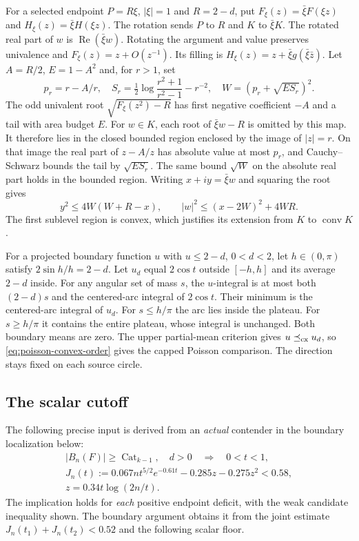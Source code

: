 \documentclass[11pt]{article}
\newcommand{\Cat}{\operatorname{Cat}}
\begin{document}
	For a selected endpoint $P=R\xi$, $|\xi|=1$ and $R=2-d$, put
	$F_\xi(z)=\bar\xi F(\xi z)$ and $H_\xi(z)=\bar\xi H(\xi z)$.
	The rotation sends $P$ to $R$ and $K$ to $\bar\xi K$.
	The rotated real part of $w$ is $\operatorname{Re}(\bar\xi w)$.
	Rotating the argument and value preserves univalence and
	$F_\xi(z)=z+O(z^{-1})$. Its filling is
	$H_\xi(z)=z+\bar\xi g(\bar\xi\bar z)$.
	Let $A=R/2$, $E=1-A^2$ and, for $r>1$, set
	\[
	p_r=r-A/r,\quad
	S_r=\tfrac12\log\frac{r^2+1}{r^2-1}-r^{-2},\quad
	W=(p_r+\sqrt{E S_r})^2.
	\]
	The odd univalent root $\sqrt{F_\xi(z^2)-R}$ has first negative
	coefficient $-A$ and a tail with area budget $E$. For $w\in K$,
	each root of $\bar\xi w-R$ is omitted by this map. It therefore lies
	in the closed bounded region enclosed by the image of $|z|=r$.
	On that image the real part of $z-A/z$ has absolute value at most
	$p_r$, and Cauchy--Schwarz bounds the tail by $\sqrt{ES_r}$.
	The same bound $\sqrt W$ on the absolute real part holds in the
	bounded region. Writing $x+iy=\bar\xi w$ and squaring the root gives
	\begin{equation}\label{eq:whole-strip}
		y^2\leq4W(W+R-x),
		\qquad |w|^2\leq(x-2W)^2+4WR.
	\end{equation}
	The first sublevel region is convex, which justifies its extension
	from $K$ to $\operatorname{conv}K$.
	
	For a projected boundary function $u$ with $u\leq2-d$, $0<d<2$,
	let $h\in(0,\pi)$ satisfy $2\sin h/h=2-d$. Let $u_d$ equal
	$2\cos t$ outside $[-h,h]$ and its average $2-d$ inside.
	For any angular set of mass $s$, the $u$-integral is at most both
	$(2-d)s$ and the centered-arc integral of $2\cos t$. Their minimum
	is the centered-arc integral of $u_d$. For $s\leq h/\pi$ the arc lies
	inside the plateau. For $s\geq h/\pi$ it contains the entire plateau,
	whose integral is unchanged. Both boundary means are zero. The upper
	partial-mean criterion gives $u\preceq_{\rm cx}u_d$, so
	\eqref{eq:poisson-convex-order} gives the capped Poisson comparison.
	The direction stays fixed on each source circle.
	\subsection{The scalar cutoff}
	The following precise input is derived from an \emph{actual} contender
	in the boundary localization below:
	\begin{equation}\label{eq:candidate-input}
		\begin{gathered}
			|B_n(F)|\geq\Cat_{k-1},\quad d>0
			\quad\Longrightarrow\quad 0<t<1,\\
			J_n(t):=0.067nt^{5/2}e^{-0.61t}-0.285z-0.275z^2<0.58,\\
			z=0.34t\log(2n/t).
		\end{gathered}
	\end{equation}
	The implication holds for \emph{each} positive endpoint deficit,
	with the weak candidate inequality shown.  The boundary argument
	obtains it from the joint estimate
	$J_n(t_1)+J_n(t_2)<0.52$ and the following scalar floor.
	
\end{document}
